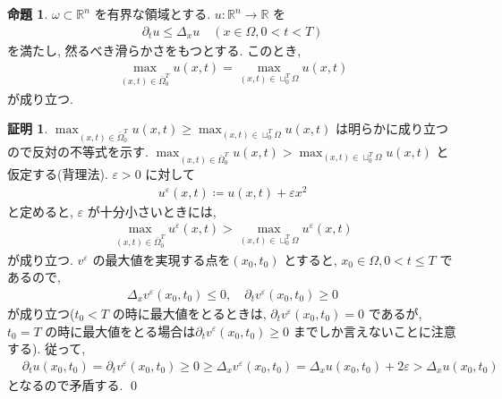 \documentclass[10pt, fleqn, label-section=none]{bxjsarticle}
\theoremstyle{definition}
\newtheorem{prop}[dfn]{命題}
\newtheorem*{pf*}{証明}
\newcommand{\veps}{\varepsilon}
\renewcommand{\;}{\, ; \,}
\begin{document}
\begin{prop}$\omega \subset \mathbb R^n$ を有界な領域とする. $u: \mathbb R^n \rightarrow \mathbb R$ を
\begin{align*} \partial_t u \leq \Delta_x u  \quad (x \in \Omega, 0 < t < T)\end{align*}
を満たし, 然るべき滑らかさをもつとする. このとき, 
\begin{align*}     \max_{(x, t) \in \bar \Omega_0^T  } u(x, t) = \max_{(x, t) \in \sqcup_0^T \Omega  } u(x, t)        \end{align*}
が成り立つ. 
\end{prop}
\begin{pf*}$ \max_{(x, t) \in \bar \Omega_0^T} u(x, t) \geq  \max_{(x, t) \in \sqcup_0^T \Omega  } u(x, t) $ は明らかに成り立つので反対の不等式を示す. $ \max_{(x, t) \in \bar \Omega_0^T} u(x, t) >  \max_{(x, t) \in \sqcup_0^T \Omega  } u(x, t) $ と仮定する(背理法). $\veps > 0$ に対して
\begin{align*} u^\veps (x, t) \coloneqq u(x, t) + \veps x^2 \end{align*} 
と定めると, $\veps  $ が十分小さいときには, 
\begin{align*}  \max_{(x, t) \in \bar \Omega_0^T} u^\veps (x, t) >  \max_{(x, t) \in \sqcup_0^T \Omega  } u^\veps (x, t)  \end{align*}
が成り立つ. $v^\veps$ の最大値を実現する点を$(x_0, t_0) $ とすると, $x_0 \in \Omega, 0 < t \leq T$ であるので, 
\begin{align*} \Delta_x v^\veps (x_0, t_0) \leq 0, \quad \partial_t v^\veps (x_0, t_0) \geq 0 \end{align*}
が成り立つ($t_0 < T$ の時に最大値をとるときは, $\partial_t v^\veps (x_0, t_0) = 0$ であるが, $t_0 = T$ の時に最大値をとる場合は$\partial_t v^\veps (x_0, t_0) \geq 0$ までしか言えないことに注意する). 従って,
\begin{align*} &\partial_t u (x_0, t_0) = \partial_t v^\veps (x_0, t_0) \geq 0 \geq \Delta_x v^\veps (x_0, t_0) = \Delta_x u (x_0, t_0) + 2 \veps > \Delta_x u (x_0, t_0)  \end{align*}
となるので矛盾する. 
\qed
\end{pf*}
\end{document}
